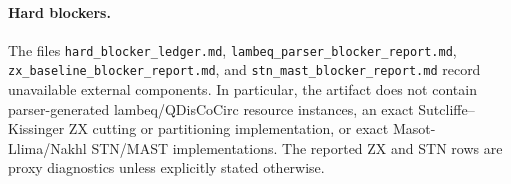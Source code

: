 \paragraph{Hard blockers.}
The files \texttt{hard\_blocker\_ledger.md}, \texttt{lambeq\_parser\_blocker\_report.md}, \texttt{zx\_baseline\_blocker\_report.md}, and \texttt{stn\_mast\_blocker\_report.md} record unavailable external components. In particular, the artifact does not contain parser-generated lambeq/QDisCoCirc resource instances, an exact Sutcliffe--Kissinger ZX cutting or partitioning implementation, or exact Masot-Llima/Nakhl STN/MAST implementations. The reported ZX and STN rows are proxy diagnostics unless explicitly stated otherwise.

